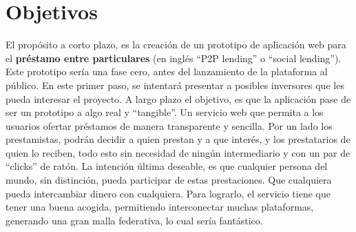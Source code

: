 \documentclass[a4paper, 12pt]{book}
\begin{document}

\chapter{Objetivos}
\label{chap:objetivos}


El propósito a corto plazo, es la creación de un prototipo de aplicación web 
para el \textbf{préstamo entre particulares} (en inglés ``P2P lending'' o 
``social lending''). Este prototipo sería una fase cero, antes del lanzamiento 
de la plataforma al público. En este primer paso, se intentará presentar a 
posibles inversores que les pueda interesar el proyecto. A largo plazo el 
objetivo, es que la aplicación pase de ser un prototipo a algo real y 
``tangible''. Un servicio web que permita a los usuarios ofertar préstamos de 
manera transparente y sencilla. Por un lado los prestamistas, podrán decidir a 
quien prestan y a que interés, y los prestatarios de quien lo reciben, todo esto 
sin necesidad de ningún intermediario y con un par de ``clicks'' de ratón. La 
intención última deseable, es que cualquier persona del mundo, sin distinción, 
pueda participar de estas prestaciones. Que cualquiera pueda intercambiar 
dinero con cualquiera. Para lograrlo, el servicio tiene que tener una buena 
acogida, permitiendo interconectar muchas plataformas, generando una gran malla 
federativa, lo cual sería fantástico.
\end{document}
